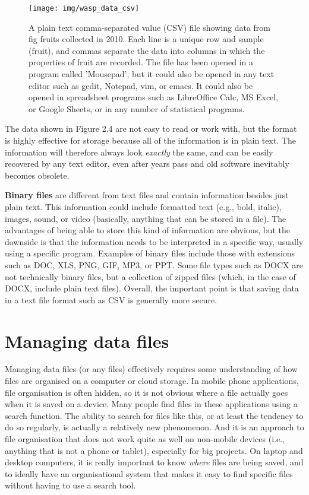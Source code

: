 \documentclass[
]{scrbook}
\begin{document}
\begin{figure}
\texttt{[image: img/wasp\_data\_csv]} \caption{A plain text comma-separated value (CSV) file showing data from fig fruits collected in 2010. Each line is a unique row and sample (fruit), and commas separate the data into columns in which the properties of fruit are recorded. The file has been opened in a program called 'Mousepad', but it could also be opened in any text editor such as gedit, Notepad, vim, or emacs. It could also be opened in spreadsheet programs such as LibreOffice Calc, MS Excel, or Google Sheets, or in any number of statistical programs.}\label{fig:unnamed-chunk-6}
\end{figure}

The data shown in Figure 2.4 are not easy to read or work with, but the format is highly effective for storage because all of the information is in plain text.
The information will therefore always look \emph{exactly} the same, and can be easily recovered by any text editor, even after years pass and old software inevitably becomes obsolete.

\textbf{Binary files} are different from text files and contain information besides just plain text.
This information could include formatted text (e.g., bold, italic), images, sound, or video (basically, anything that can be stored in a file).
The advantages of being able to store this kind of information are obvious, but the downside is that the information needs to be interpreted in a specific way, usually using a specific program.
Examples of binary files include those with extensions such as DOC, XLS, PNG, GIF, MP3, or PPT.
Some file types such as DOCX are not technically binary files, but a collection of zipped files (which, in the case of DOCX, include plain text files).
Overall, the important point is that saving data in a text file format such as CSV is generally more secure.

\hypertarget{managing-data-files}{%
\section{Managing data files}\label{managing-data-files}}

Managing data files (or any files) effectively requires some understanding of how files are organised on a computer or cloud storage.
In mobile phone applications, file organisation is often hidden, so it is not obvious where a file actually goes when it is saved on a device.
Many people find files in these applications using a search function.
The ability to search for files like this, or at least the tendency to do so regularly, is actually a relatively new phenomenon.
And it is an approach to file organisation that does not work quite as well on non-mobile devices (i.e., anything that is not a phone or tablet), especially for big projects.
On laptop and desktop computers, it is really important to know \emph{where} files are being saved, and to ideally have an organisational system that makes it easy to find specific files without having to use a search tool.
\end{document}
